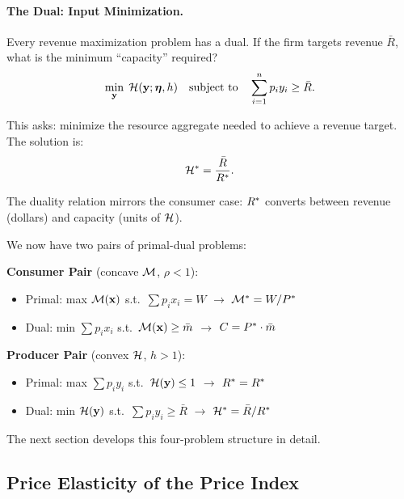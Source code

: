 \paragraph{The Dual: Input Minimization.}
Every revenue maximization problem has a dual. If the firm targets revenue $\bar{R}$, what is the minimum ``capacity'' required?
\begin{equation}
\label{eq:input-min}
\min_{\mathbf{y}} \; \mathcal{H}(\mathbf{y}; \bm{\eta}, h) \quad \text{subject to} \quad \sum_{i=1}^{n} p_i y_i \geq \bar{R}.
\end{equation}

This asks: minimize the resource aggregate needed to achieve a revenue target. The solution is:
\begin{equation}
\mathcal{H}^* = \frac{\bar{R}}{R^{*}}.
\end{equation}

The duality relation mirrors the consumer case: $R^{*}$ converts between revenue (dollars) and capacity (units of $\mathcal{H}$).

\begin{calloutimportant}
We now have two pairs of primal-dual problems:

\medskip
\textbf{Consumer Pair} (concave $\mathcal{M}$, $\rho < 1$):
\begin{itemize}[nosep, leftmargin=2em]
\item Primal: max $\mathcal{M}(\mathbf{x})$ s.t.\ $\sum p_i x_i = W$ \quad $\longrightarrow$ \quad $\mathcal{M}^* = W/P^{*}$
\item Dual: min $\sum p_i x_i$ s.t.\ $\mathcal{M}(\mathbf{x}) \geq \bar{m}$ \quad $\longrightarrow$ \quad $C = P^{*} \cdot \bar{m}$
\end{itemize}

\medskip
\textbf{Producer Pair} (convex $\mathcal{H}$, $h > 1$):
\begin{itemize}[nosep, leftmargin=2em]
\item Primal: max $\sum p_i y_i$ s.t.\ $\mathcal{H}(\mathbf{y}) \leq 1$ \quad $\longrightarrow$ \quad $R^* = R^{*}$
\item Dual: min $\mathcal{H}(\mathbf{y})$ s.t.\ $\sum p_i y_i \geq \bar{R}$ \quad $\longrightarrow$ \quad $\mathcal{H}^* = \bar{R}/R^{*}$
\end{itemize}

\medskip
The next section develops this four-problem structure in detail.
\end{calloutimportant}

\subsection{Price Elasticity of the Price Index}
\label{subsec:price-elasticity}

